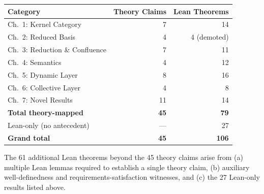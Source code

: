 \begin{center}
\begin{tabular}{lrr}
\toprule
Category & Theory Claims & Lean Theorems \\
\midrule
Ch.\ 1: Kernel Category         & 7  & 14 \\
Ch.\ 2: Reduced Basis           & 4  & 4 (demoted) \\
Ch.\ 3: Reduction \& Confluence & 7  & 11 \\
Ch.\ 4: Semantics               & 4  & 12 \\
Ch.\ 5: Dynamic Layer           & 8  & 16 \\
Ch.\ 6: Collective Layer        & 4  & 8 \\
Ch.\ 7: Novel Results           & 11 & 14 \\
\midrule
\textbf{Total theory-mapped}    & \textbf{45} & \textbf{79} \\
Lean-only (no antecedent)       & ---         & 27 \\
\midrule
\textbf{Grand total}            & \textbf{45} & \textbf{106} \\
\bottomrule
\end{tabular}
\end{center}

\noindent The 61 additional Lean theorems beyond the 45 theory claims arise from
(a) multiple Lean lemmas required to establish a single theory claim,
(b) auxiliary well-definedness and requirements-satisfaction witnesses,
and (c) the 27 Lean-only results listed above.
